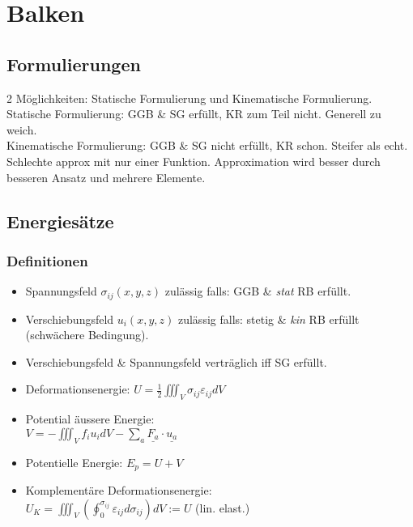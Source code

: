 \section{Balken}
    \subsection{Formulierungen}
        2 Möglichkeiten: Statische Formulierung und Kinematische Formulierung.\\
        Statische Formulierung: GGB \& SG erfüllt, KR zum Teil nicht. Generell zu weich.\\
        Kinematische Formulierung: GGB \& SG nicht erfüllt, KR schon. Steifer als echt. Schlechte approx mit nur einer Funktion. Approximation wird besser durch besseren Ansatz und mehrere Elemente.
    \subsection{Energiesätze}
        \subsubsection{Definitionen}
            \begin{itemize}
                \item Spannungsfeld $\sigma_{ij}(x,y,z)$ zulässig falls: GGB \& \textit{stat} RB erfüllt.
                \item Verschiebungsfeld $u_i(x,y,z)$ zulässig falls: stetig \& \textit{kin} RB erfüllt (schwächere Bedingung).
                \item Verschiebungsfeld \& Spannungsfeld verträglich iff SG erfüllt.
                \item Deformationsenergie: $\displaystyle U=\frac{1}{2}\iiint_V \sigma_{ij}\varepsilon_{ij}dV$
                \item Potential äussere Energie:\\
                $\displaystyle V=-\iiint_V f_iu_idV-\sum_{a}\underline{F_a}\cdot\underline{u_a}$ 
                \item Potentielle Energie: $E_p=U+V$
                \item Komplementäre Deformationsenergie:\\ $U_K=\iiint_V(\oint_0^{\sigma_{ij}}\varepsilon_{ij}d\sigma_{ij})dV := U$  (lin. elast.)
            \end{itemize}
            
